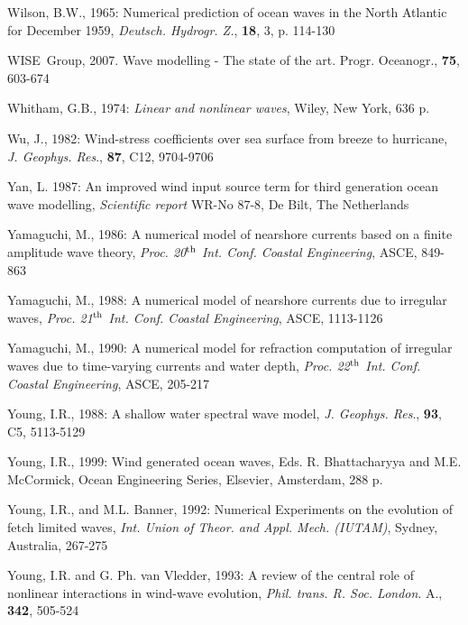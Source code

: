 \documentclass[12pt]{book}
\begin{document}
\begin{thebibliography}{10}


Wilson, B.W., 1965: Numerical prediction of ocean waves in the North Atlantic for December 1959,
{\it Deutsch. Hydrogr. Z.}, {\bf 18}, 3, p. 114-130

WISE~Group, 2007. Wave modelling - The state of the art. Progr. Oceanogr., {\bf 75}, 603-674

Whitham, G.B., 1974: {\it Linear and nonlinear waves}, Wiley, New York, 636 p.

Wu, J., 1982: Wind-stress coefficients over sea surface from breeze to hurricane, {\it J. Geophys. Res}., {\bf 87},
C12, 9704-9706

Yan, L. 1987: An improved wind input source term for third generation ocean wave modelling, {\it Scientific
report} WR-No 87-8, De Bilt, The Netherlands

Yamaguchi, M., 1986: A numerical model of nearshore currents based on a finite amplitude wave theory,
{\it Proc. 20$^{{\rm th}}$ Int. Conf. Coastal Engineering}, ASCE, 849-863

Yamaguchi, M., 1988: A numerical model of nearshore currents due to irregular waves, {\it Proc. 21$^{{\rm th}}$ Int.
Conf. Coastal Engineering}, ASCE, 1113-1126

Yamaguchi, M., 1990: A numerical model for refraction computation of irregular waves due to time-varying
currents and water depth, {\it Proc. 22$^{{\rm th}}$ Int. Conf. Coastal Engineering}, ASCE, 205-217

Young, I.R., 1988: A shallow water spectral wave model, {\it J. Geophys. Res}., {\bf 93}, C5, 5113-5129

Young, I.R., 1999: Wind generated ocean waves, Eds. R. Bhattacharyya and M.E. McCormick, Ocean Engineering Series,
Elsevier, Amsterdam, 288 p.

Young, I.R., and M.L. Banner, 1992: Numerical Experiments on the evolution of fetch limited waves, {\it Int.
Union of Theor. and Appl. Mech. (IUTAM)}, Sydney, Australia, 267-275

Young, I.R. and G. Ph. van Vledder, 1993: A review of the central role of nonlinear interactions in wind-wave evolution,
{\it Phil. trans. R. Soc. London}. A., {\bf 342}, 505-524


\end{thebibliography}
\end{document}
